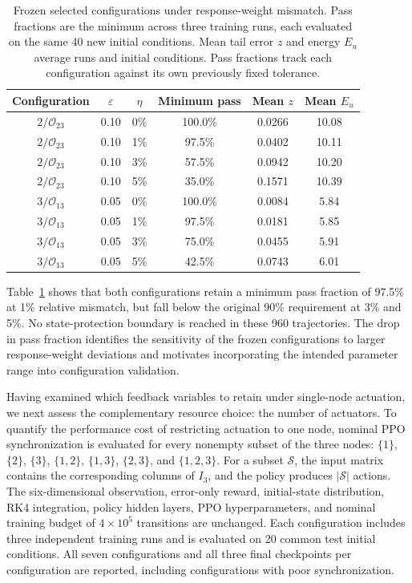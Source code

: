 \documentclass[a4paper,fleqn]{cas-sc}
\theoremstyle{plain}
\theoremstyle{definition}
\begin{document}
\begin{table}[pos=!t,width=\textwidth]
\centering
\caption{Frozen selected configurations under response-weight mismatch. Pass fractions are the minimum across three training runs, each evaluated on the same 40 new initial conditions. Mean tail error $z$ and energy $E_u$ average runs and initial conditions. Pass fractions track each configuration against its own previously fixed tolerance.}
\label{tab:configuration_transfer}
\small
\begin{tabular}{cccccc}
\toprule
Configuration & $\varepsilon$ & $\eta$ & Minimum pass & Mean $z$ & Mean $E_u$\\
\midrule
$2/\mathcal O_{23}$ & 0.10 & 0\% & 100.0\% & 0.0266 & 10.08\\
$2/\mathcal O_{23}$ & 0.10 & 1\% & 97.5\% & 0.0402 & 10.11\\
$2/\mathcal O_{23}$ & 0.10 & 3\% & 57.5\% & 0.0942 & 10.20\\
$2/\mathcal O_{23}$ & 0.10 & 5\% & 35.0\% & 0.1571 & 10.39\\
$3/\mathcal O_{13}$ & 0.05 & 0\% & 100.0\% & 0.0084 & 5.84\\
$3/\mathcal O_{13}$ & 0.05 & 1\% & 97.5\% & 0.0181 & 5.85\\
$3/\mathcal O_{13}$ & 0.05 & 3\% & 75.0\% & 0.0455 & 5.91\\
$3/\mathcal O_{13}$ & 0.05 & 5\% & 42.5\% & 0.0743 & 6.01\\
\bottomrule
\end{tabular}
\end{table}

Table~\ref{tab:configuration_transfer} shows that both configurations retain a minimum pass fraction of 97.5\% at 1\% relative mismatch, but fall below the original 90\% requirement at 3\% and 5\%. No state-protection boundary is reached in these 960 trajectories. The drop in pass fraction identifies the sensitivity of the frozen configurations to larger response-weight deviations and motivates incorporating the intended parameter range into configuration validation.


Having examined which feedback variables to retain under single-node actuation, we next assess the complementary resource choice: the number of actuators. To quantify the performance cost of restricting actuation to one node, nominal PPO synchronization is evaluated for every nonempty subset of the three nodes: $\{1\}$, $\{2\}$, $\{3\}$, $\{1,2\}$, $\{1,3\}$, $\{2,3\}$, and $\{1,2,3\}$. For a subset $\mathcal S$, the input matrix contains the corresponding columns of $I_3$, and the policy produces $|\mathcal S|$ actions. The six-dimensional observation, error-only reward, initial-state distribution, RK4 integration, policy hidden layers, PPO hyperparameters, and nominal training budget of $4\times10^5$ transitions are unchanged. Each configuration includes three independent training runs and is evaluated on 20 common test initial conditions. All seven configurations and all three final checkpoints per configuration are reported, including configurations with poor synchronization.
\end{document}
